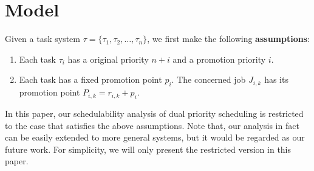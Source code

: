 \section{Model}

Given a task system $\tau=\{\tau_1,\tau_2,\ldots, \tau_n\}$, we first make the following \textbf{assumptions}:
\begin{enumerate}
	\item Each task  $\tau_i$ has a original priority $n+i$ and a promotion priority $i$.
	\item Each task has a fixed promotion point $p_i$. The concerned job $J_{i,k}$ has its promotion point $P_{i,k}=r_{i,k}+p_i$.
\end{enumerate}

In this paper, our schedulability analysis of dual priority scheduling is restricted to the case that satisfies the above assumptions. Note that, our analysis in fact can be easily extended to more general systems, but it would be regarded as our future work.  For simplicity, we will only present the restricted version in this paper.







